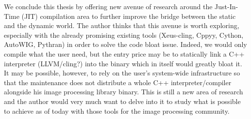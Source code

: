 We conclude this thesis by offering new avenue of research around the Just-In-Time (JIT) compilation area to further
improve the bridge between the static and the dynamic world. The author thinks that this avenue is worth exploring,
especially with the already promising existing tools (Xeus-cling, Cppyy, Cython, AutoWIG, Pythran) in order to solve the
code bloat issue. Indeed, we would only compile what the user need, but the entry price may be to statically link a C++
interpreter (LLVM/cling?) into the binary which in itself would greatly bloat it. It may be possible, however, to rely
on the user's system-wide infrastructure so that the maintenance does not distribute a whole C++ interpreter/compiler
alongside his image processing library binary. This is still a new area of research and the author would very much want
to delve into it to study what is possible to achieve as of today with those tools for the image processing community.
